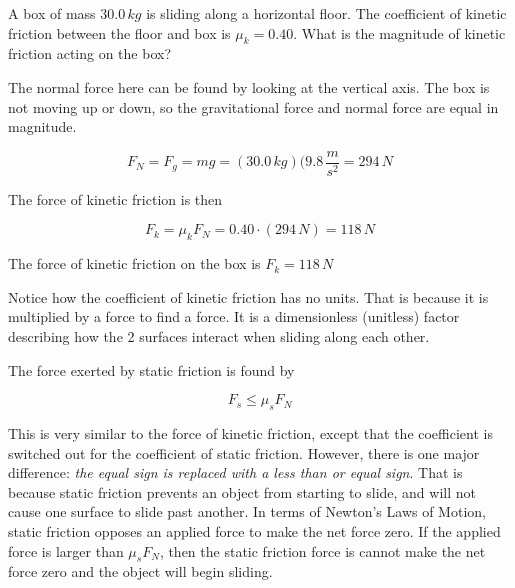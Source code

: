 \documentclass[12pt]{book}
\begin{document}
\begin{exampleblock}

A box of mass $30.0 \, kg$ is sliding along a horizontal floor. The coefficient of kinetic friction between the floor and box is $\mu_k = 0.40$. What is the magnitude of kinetic friction acting on the box?

\hspace{10pt}

The normal force here can be found by looking at the vertical axis. The box is not moving up or down, so the gravitational force and normal force are equal in magnitude.

\begin{equation}
F_N = F_g = mg = (30.0 \, kg)(9.8 \, \frac{m}{s^2} = 294 \, N
\end{equation}

The force of kinetic friction is then

\begin{equation}
F_k = \mu_k F_N = 0.40 \cdot (294 \, N) = 118 \, N
\end{equation}

The force of kinetic friction on the box is $F_k = 118 \, N$

\end{exampleblock}

Notice how the coefficient of kinetic friction has no units. That is because it is multiplied by a force to find a force. It is a dimensionless (unitless) factor describing how the 2 surfaces interact when sliding along each other.

The force exerted by static friction is found by

\begin{equation}
F_s \leq \mu_s F_N
\label{sfriction}
\end{equation}

This is very similar to the force of kinetic friction, except that the coefficient is switched out for the coefficient of static friction. However, there is one major difference: \textit{the equal sign is replaced with a less than or equal sign}. That is because static friction prevents an object from starting to slide, and will not cause one surface to slide past another. In terms of Newton's Laws of Motion, static friction opposes an applied force to make the net force zero. If the applied force is larger than $\mu_s F_N$, then the static friction force is cannot make the net force zero and the object will begin sliding. 
\end{document}
